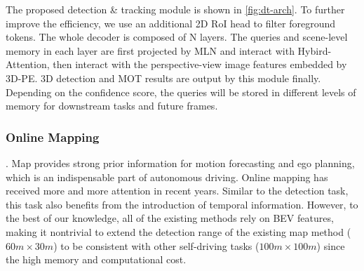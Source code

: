 The proposed detection \& tracking module is shown in \cref{fig:dt-arch}. To further improve the efficiency, we use an additional 2D RoI head to filter foreground tokens\cite{wang2023focal}. The whole decoder is composed of N layers. The queries and scene-level memory in each layer are first projected by MLN and interact with Hybird-Attention\cite{wang2023exploring}, then interact with the perspective-view image features embedded by 3D-PE\cite{liu2022petr}. 3D detection and MOT results are output by this module finally. Depending on the confidence score, the queries will be stored in different levels of memory for downstream tasks and future frames.



\subsubsection{Online Mapping}. Map provides strong prior information for motion forecasting and ego planning, which is an indispensable part of autonomous driving. Online mapping has received more and more attention in recent years\cite{li2022hdmapnet,liu2023vectormapnet,qiao2023end,ding2023pivotnet}. Similar to the detection task, this task also benefits from the introduction of temporal information\cite{yuan2024streammapnet}. However,  to the best of our knowledge, all of the existing methods rely on BEV features, making it nontrivial to extend the detection range of the existing map method ($60m \times 30m$) to be consistent with other self-driving tasks ($100m \times 100m$) since the high memory and computational cost.



